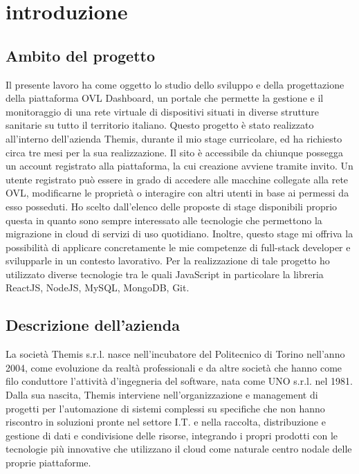 \chapter{introduzione}
\label{chap:introduzione}

\section{Ambito del progetto}
\label{sec:ambito del progetto}

Il presente lavoro ha come oggetto lo studio dello sviluppo e della progettazione della piattaforma OVL Dashboard, un portale che permette la gestione e il monitoraggio di una rete virtuale di dispositivi situati in diverse strutture sanitarie su tutto il territorio italiano. Questo progetto è stato realizzato all’interno dell’azienda Themis, durante il mio stage curricolare, ed ha richiesto circa tre mesi per la sua realizzazione.
Il sito è accessibile da chiunque possegga un account registrato alla piattaforma, la cui creazione avviene tramite invito. Un utente registrato può essere in grado di accedere alle macchine collegate alla rete OVL, modificarne le proprietà o interagire con altri utenti in base ai permessi da esso posseduti.
Ho scelto dall’elenco delle proposte di stage disponibili proprio questa in quanto sono sempre interessato alle tecnologie che permettono la migrazione in cloud di servizi di uso quotidiano. Inoltre, questo stage mi offriva la possibilità di applicare concretamente le mie competenze di full-stack developer e svilupparle in un contesto lavorativo.
Per la realizzazione di tale progetto ho utilizzato diverse tecnologie tra le quali JavaScript in particolare la libreria ReactJS, NodeJS, MySQL, MongoDB, Git.

\section{Descrizione dell'azienda}
\label{sec:descrizione dell'azienda}

La società Themis s.r.l. nasce nell’incubatore del Politecnico di Torino nell’anno 2004, come evoluzione da realtà professionali e da altre società che hanno come filo conduttore l’attività d’ingegneria del software, nata come UNO s.r.l. nel 1981. Dalla sua nascita, Themis interviene nell’organizzazione e management di progetti per l’automazione di sistemi complessi su specifiche che non hanno riscontro in soluzioni pronte nel settore I.T. e nella  raccolta, distribuzione e gestione di dati e condivisione delle risorse, integrando i propri prodotti con le tecnologie più innovative che utilizzano il cloud come naturale centro nodale delle proprie piattaforme.